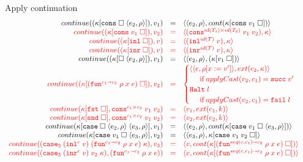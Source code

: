 \documentclass[acmsmall,review,anonymous]{acmart}\settopmatter{printfolios=true,printccs=false,printacmref=false}
\newcommand{\funrule}[3]{#1 &=& #2 & #3\\}
\newcommand{\hifunrule}[3]{\highlight{#1} &\highlight{=}& \highlight{#2} & 
\highlight{#3}\\}
\newcommand{\sOOinspect}[3]{\langle\langle#1,#2\rangle,#3\rangle}
\newcommand{\sOOreturn}[2]{\langle#1,#2\rangle}
\newcommand{\sOOhalt}[1]{\mathtt{Halt} \; #1}
\newcommand{\POOfun}[2]{#1 \shortrightarrow #2}
\newcommand{\POOprod}[2]{#1 \times #2}
\newcommand{\rOOsucc}[1]{\mathtt{succ}\;#1}
\newcommand{\rOOfail}[1]{\mathtt{fail}\;#1}
\newcommand{\kOOconsI}[3]{#3[\mathtt{cons} \; \square \; \langle#1,#2\rangle ]}
\newcommand{\kOOconsII}[2]{#2[\mathtt{cons} \; #1 \; \square]}
\newcommand{\kOOinl}[1]{#1[\mathtt{inl} \; \square]}
\newcommand{\kOOinr}[1]{#1[\mathtt{inr} \; \square]}
\newcommand{\kOOappI}[3]{
	#3[\square \; \langle#1,#2\rangle ]
}
\newcommand{\kOOappII}[2]{
	#2[#1 \; \square]}
\newcommand{\kOOcar}[1]{#1[\mathtt{fst} \; \square]}
\newcommand{\kOOcdr}[1]{#1[\mathtt{snd} \; \square]}
\newcommand{\kOOcaseI}[4]{
	#4[\mathtt{case} \; \square \; \langle#1,#3\rangle \; \langle#2,#3\rangle ]}
\newcommand{\kOOcaseII}[4]{
	#4[\mathtt{case} \; #1 \; \square \; \langle#2,#3\rangle ]}
\newcommand{\kOOcaseIII}[3]{
	#3[\mathtt{case} \; #1 \; #2 \; \square]}
\newcommand{\hcvOOfun}[5]{\mathtt{fun}^{\POOfun{#1}{#5}} \; #2 \; #3 \; #4}
\newcommand{\hcvOOcons}[4]{\mathtt{cons}^{\POOprod{#2}{#4}}\;#1\;#3}
\newcommand{\hcvOOinl}[2]{\mathtt{inl}^{#2}\;#1}
\newcommand{\hcvOOinr}[2]{\mathtt{inr}^{#2}\;#1}
\newcommand{\sidecond}[1]{\text{if}\;#1}
\newcommand{\continue}[2]{continue(#2,#1)}
\newcommand{\highlight}[1]{{\color{red} #1}}
\begin{document}
\begin{figure}
	Apply continuation
	\[
	\begin{array}{rclr}
	

\funrule{
	\continue{v_1}{(\kOOconsI{e_2}{\rho}{\kappa})}}{
	\sOOinspect{e_2}{\rho}{cont(\kOOconsII{v_1}{\kappa})}}{}

\hifunrule{
	\continue{v_2}{(\kOOconsII{v_1}{\kappa})}}{
	\sOOreturn{(\hcvOOcons{v_1}{id(T_1)}{v_2}{id(T_2)})}{\kappa}}{}

\hifunrule{
	\continue{v}{(\kOOinl{\kappa})}}{
	\sOOreturn{(\hcvOOinl{v}{id(T)})}{\kappa}}{}

\hifunrule{
	\continue{v}{(\kOOinr{\kappa})}}{
	\sOOreturn{(\hcvOOinr{v}{id(T)})}{\kappa}}{}

\funrule{
	\continue{v_1}{(\kOOappI{e_2}{\rho}{\kappa})}}{
	\sOOinspect{e_2}{\rho}{(\kOOappII{v_1}{\kappa})}}{}


\hifunrule{
	\continue{v_2}{(\kOOappII{(\hcvOOfun{c_1}{\rho}{x}{e}{c_2})}{\kappa})}}{
\begin{cases}
	\sOOinspect{e}{\rho[x:=v']}{ext(c_2,\kappa)} \\
\;\;\;\;\;\sidecond{applyCast(v_2,c_1) = \rOOsucc{v'}}
\\
\sOOhalt{l} \\
\;\;\;\;\;\sidecond{applyCast(v_2,c_1) = \rOOfail{l}}
\end{cases}
}{}

\hifunrule{
	\continue{\hcvOOcons{v_1}{c_1}{v_2}{c_2}}{
		\kOOcar{\kappa}
	}
}{
	\sOOreturn{v_1}{ext(c_1,k)}
}{}
\hifunrule{
	\continue{\hcvOOcons{v_1}{c_1}{v_2}{c_2}}{
		\kOOcdr{\kappa}
	}
}{
	\sOOreturn{v_2}{ext(c_2,k)}
}{}

\funrule{
	\continue{v_1}{\kOOcaseI{e_2}{e_3}{\rho}{\kappa}}
}{
	\sOOinspect{e_2}{\rho}{
		cont(\kOOcaseII{v_1}{e_3}{\rho}{\kappa})
	}
}{}

\funrule{
	\continue{v_2}{
		\kOOcaseII{v_1}{e_3}{\rho}{\kappa}
	}
}{
	\sOOinspect{e_3}{\rho}{
	\kOOcaseIII{v_1}{v_2}{\kappa}
	}
}{}

\hifunrule{
	\continue{v_3}{(\mathtt{case_3}\;(\hcvOOinl{v}{c})\;
		(\hcvOOfun{c_1}{\rho}{x}{e}{c_2})
		\;\kappa)}
}{
	\sOOreturn{v}{cont(\kOOappII{(\hcvOOfun{seq(c,c_1)}{\rho}{x}{e}{c_2})}{\kappa})}
}{}

\hifunrule{
	\continue{(\hcvOOfun{c_1}{\rho}{x}{e}{c_2})}
	{(\mathtt{case_3}\;(\hcvOOinr{v}{c})\;v_2\;\kappa)}
}{
	\sOOreturn{v}{cont(\kOOappII{(\hcvOOfun{seq(c,c_1)}{\rho}{x}{e}{c_2})}{\kappa})}
}{}


\end{array}\]
\end{figure}
\end{document}
